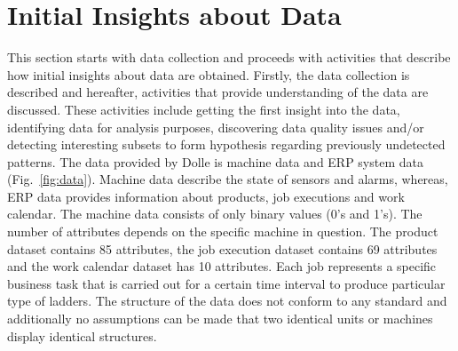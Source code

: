 \documentclass[runningheads]{llncs}
\begin{document}
\section{Initial Insights about Data}
\label{sec:dataunderstanding}
\iffalse
This section starts with data collection and proceeds with activities that targets understanding the data. These activities include first insight into the data, identifying data for analysis purposes, discovering data quality issues and/or detecting interesting subsets to form hypothesis regarding previously undetected patterns. Machine data (sensors and alarms) and ERP system data (product, job execution and work calendar) are provided by Dolle (Fig.~\ref{fig:data}). The machine data are provided in the form of binary values of 0's and 1's. The number of attributes depends on the machine in question. The product dataset consists of 85 attributes, the job execution dataset consists of 69 attributes and the work calendar dataset contains 10 attributes. Each job represents a specific business task that is carried out for a certain time interval to produce particular type of ladders. The structure of the data does not conform to any standard and additionally no assumptions can be made that two identical units or machines display identical structures. 
\fi
This section starts with  data collection and proceeds with activities that describe how initial insights about data are obtained. Firstly, the data collection is described and hereafter, activities that provide understanding of the data are discussed. These activities include getting the first insight into the data, identifying data for analysis purposes, discovering data quality issues and/or detecting interesting subsets to form hypothesis regarding previously undetected patterns. The data provided by Dolle is machine data and ERP system data (Fig.~\ref{fig:data}). Machine data describe the state of sensors and alarms, whereas, ERP data provides information about products, job executions and work calendar. The machine data consists of only binary values (0's and 1's). The number of attributes depends on the specific machine in question. The product dataset contains 85 attributes, the job execution dataset contains 69 attributes and the work calendar dataset has 10 attributes. Each job represents a specific business task that is carried out for a certain time interval to produce particular type of ladders. The structure of the data does not conform to any standard and additionally no assumptions can be made that two identical units or machines display identical structures. %
\end{document}

